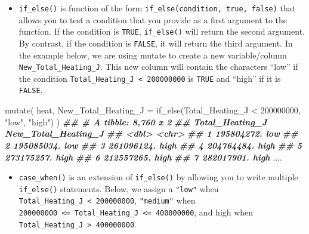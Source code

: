 \documentclass[
]{book}
\newenvironment{Shaded}{\begin{snugshade}}{\end{snugshade}}
\newcommand{\AttributeTok}[1]{\textcolor[rgb]{0.77,0.63,0.00}{#1}}
\newcommand{\DecValTok}[1]{\textcolor[rgb]{0.00,0.00,0.81}{#1}}
\newcommand{\DocumentationTok}[1]{\textcolor[rgb]{0.56,0.35,0.01}{\textbf{\textit{#1}}}}
\newcommand{\FunctionTok}[1]{\textcolor[rgb]{0.00,0.00,0.00}{#1}}
\newcommand{\NormalTok}[1]{#1}
\newcommand{\SpecialCharTok}[1]{\textcolor[rgb]{0.00,0.00,0.00}{#1}}
\newcommand{\StringTok}[1]{\textcolor[rgb]{0.31,0.60,0.02}{#1}}
\providecommand{\tightlist}{%
  \setlength{\itemsep}{0pt}\setlength{\parskip}{0pt}}
\begin{document}
\begin{itemize}
\tightlist
\item
  \texttt{if\_else()} is function of the form \texttt{if\_else(condition,\ true,\ false)} that allows you to test a condition that you provide as a first argument to the function. If the condition is \texttt{TRUE}, \texttt{if\_else()} will return the second argument. By contrast, if the condition is \texttt{FALSE}, it will return the third argument. In the example below, we are using mutate to create a new variable/column \texttt{New\_Total\_Heating\_J}. This new column will contain the characters ``low'' if the condition \texttt{Total\_Heating\_J\ \textless{}\ 200000000} is \texttt{TRUE} and ``high'' if it is \texttt{FALSE}.
\end{itemize}

\begin{Shaded}
\begin{Highlighting}[]
\FunctionTok{mutate}\NormalTok{(}
\NormalTok{  heat,}
  \AttributeTok{New\_Total\_Heating\_J =} \FunctionTok{if\_else}\NormalTok{(Total\_Heating\_J }\SpecialCharTok{\textless{}} \DecValTok{200000000}\NormalTok{, }\StringTok{"low"}\NormalTok{, }\StringTok{"high"}\NormalTok{)}
\NormalTok{  )}
\DocumentationTok{\#\# \# A tibble: 8,760 x 2}
\DocumentationTok{\#\#    Total\_Heating\_J New\_Total\_Heating\_J}
\DocumentationTok{\#\#              \textless{}dbl\textgreater{} \textless{}chr\textgreater{}              }
\DocumentationTok{\#\#  1      195804272. low                }
\DocumentationTok{\#\#  2      195085034. low                }
\DocumentationTok{\#\#  3      261096124. high               }
\DocumentationTok{\#\#  4      204764484. high               }
\DocumentationTok{\#\#  5      273175257. high               }
\DocumentationTok{\#\#  6      212557265. high               }
\DocumentationTok{\#\#  7      282017901. high               }
\NormalTok{....}
\end{Highlighting}
\end{Shaded}

\begin{itemize}
\tightlist
\item
  \texttt{case\_when()} is an extension of \texttt{if\_else()} by allowing you to write multiple \texttt{if\_else()} statements. Below, we assign a \texttt{"low"} when \texttt{Total\_Heating\_J\ \textless{}\ 200000000}, \texttt{"medium"} when \texttt{200000000\ \textless{}=\ Total\_Heating\_J\ \textless{}=\ 400000000}, and high when \texttt{Total\_Heating\_J\ \textgreater{}\ 400000000}.
\end{itemize}
\end{document}
